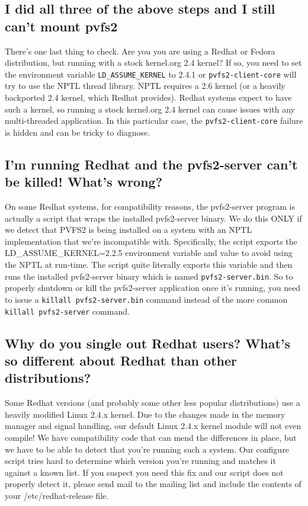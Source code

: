 \documentclass[11pt,letterpaper]{article}
\begin{document}
\subsection{I did all three of the above steps and I still can't mount pvfs2}
\label{sec:nptl_and_mounting}

There's one last thing to check.  Are you you are using a Redhat or Fedora
distribution, but running with a stock kernel.org 2.4 kernel?  If so, you need
to set the environment variable \texttt{LD\_ASSUME\_KERNEL} to 2.4.1 or
\texttt{pvfs2-client-core} will try to use the NPTL thread library.  NPTL
requires a 2.6 kernel (or a heavily backported 2.4 kernel, which Redhat
provides).  Redhat systems expect to have such a kernel, so running a stock
kernel.org 2.4 kernel can cause issues with any multi-threaded application.  In
this particular case, the \texttt{pvfs2-client-core} failure is hidden and can
be tricky to diagnose. 

\subsection{I'm running Redhat and the pvfs2-server can't be killed! What's wrong?}

On some Redhat systems, for compatibility reasons, the pvfs2-server
program is actually a script that wraps the installed pvfs2-server
binary.  We do this ONLY if we detect that PVFS2 is being installed on
a system with an NPTL implementation that we're incompatible with.
Specifically, the script exports the LD\_ASSUME\_KERNEL=2.2.5
environment variable and value to avoid using the NPTL at run-time.
The script quite literally exports this variable and then runs the
installed pvfs2-server binary which is named
\texttt{pvfs2-server.bin}.  So to properly shutdown or kill the
pvfs2-server application once it's running, you need to issue a
\texttt{killall pvfs2-server.bin} command instead of the more common
\texttt{killall pvfs2-server} command.

\subsection{Why do you single out Redhat users?  What's so different
  about Redhat than other distributions?}

Some Redhat versions (and probably some other less popular
distributions) use a heavily modified Linux 2.4.x kernel.  Due to the
changes made in the memory manager and signal handling, our default
Linux 2.4.x kernel module will not even compile!  We have
compatibility code that can mend the differences in place, but we have
to be able to detect that you're running such a system.  Our configure
script tries hard to determine which version you're running and
matches it against a known list.  If you suspect you need this fix and
our script does not properly detect it, please send mail to the
mailing list and include the contents of your /etc/redhat-release
file.
\end{document}
